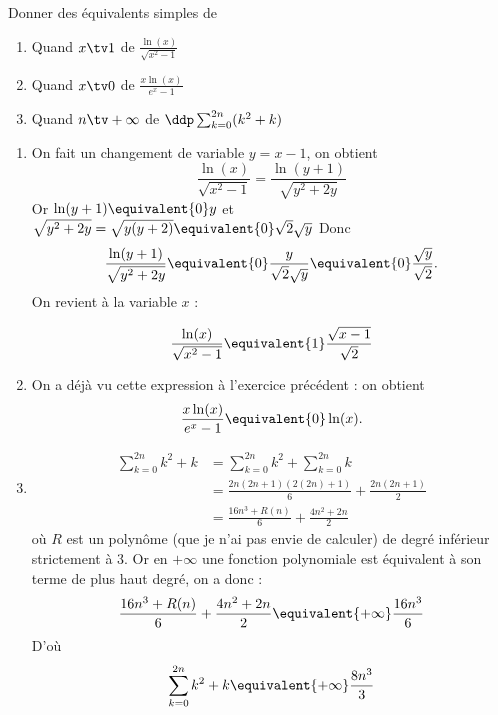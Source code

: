 \documentclass[a4paper, 11pt,reqno]{article}
\begin{document}
\begin{exercice}
Donner des équivalents simples de 
\begin{enumerate}
\item Quand $x\tv 1$ de $\frac{\ln(x)}{\sqrt{x^2-1}} $
\item Quand  $x\tv 0$ de $\frac{x\ln(x)}{e^x-1}$
\item Quand  $n\tv +\infty$  de $\ddp \sum_{k=0}^{2n}( k^2+k ) $
\end{enumerate}
\end{exercice}


\begin{correction}
\begin{enumerate}
\item 
On fait un changement de variable $y=x-1$, on obtient 
$$\frac{\ln(x)}{\sqrt{x^2-1}} = \frac{\ln(y+1)}{\sqrt{y^2+2y}} $$
Or $\ln(y+1)\equivalent{0} y$ et $\sqrt{y^2+2y}= \sqrt{y(y+2)}\equivalent{0}\sqrt{2}\sqrt{y}$
Donc $$\frac{\ln(y+1)}{\sqrt{y^2+2y}} \equivalent{0}\frac{y}{\sqrt{2}\sqrt{y}} \equivalent{0}\frac{\sqrt{y}}{\sqrt{2}}.$$
On revient à la variable $x$ : 

$$\frac{\ln(x)}{\sqrt{x^2-1}} \equivalent{1} \frac{\sqrt{x-1}}{\sqrt{2}}$$

\item On a déjà vu cette expression à l'exercice précédent : on obtient 
$$\frac{x\ln(x)}{e^x-1}\equivalent{0} \ln(x).$$
\item  
\begin{align*}
\sum_{k=0}^{2n} k^2+k   &=\sum_{k=0}^{2n} k^2 +\sum_{k=0}^{2n} k  \\
										&= \frac{2n(2n+1)(2(2n)+1)}{6}  + \frac{2n(2n+1)}{2}\\
										&=\frac{16n^3 +R(n)}{6} + \frac{4n^2+2n}{2}
\end{align*}
où $R$ est un polynôme (que je n'ai pas envie de calculer) de degré inférieur strictement à $3$. 
Or en $ +\infty $  une fonction polynomiale est équivalent à son terme de plus haut degré, on a donc : 
$$\frac{16n^3 +R(n)}{6} + \frac{4n^2+2n}{2}\equivalent{+\infty} \frac{16n^3}{6}$$
D'où
$$\sum_{k=0}^{2n} k^2+k  \equivalent{+\infty} \frac{8n^3}{3}$$


\end{enumerate}
\end{correction}
\end{document}
